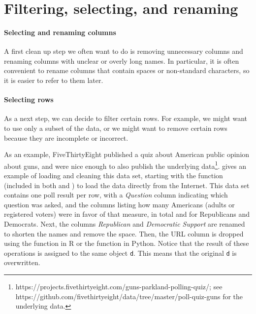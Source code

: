 \section{Filtering, selecting, and renaming}


\paragraph{Selecting and renaming columns}
A first clean up step we often want to do is removing unnecessary columns and renaming columns with unclear or overly long names.
In particular, it is often convenient to rename columns that contain spaces or non-standard characters, so it is easier to refer to them later.

\paragraph{Selecting rows}
As a next step, we can decide to filter certain rows.
For example, we might want to use only a subset of the data,
or we might want to remove certain rows because they are incomplete or incorrect.

As an example, FiveThirtyEight published a quiz about American public opinion about guns,
and were nice enough to also publish the underlying data\footnote{https://projects.fivethirtyeight.com/guns-parkland-polling-quiz/; see https://github.com/fivethirtyeight/data/tree/master/poll-quiz-guns for the underlying data.}.
 gives an example of loading and cleaning this data set, starting with the function  (included in both  and ) to load the data directly from the Internet.
This data set contains one poll result per row, with a \emph{Question} column indicating which question was asked,
and the columns listing how many Americans (adults or registered voters) were in favor of that measure, in total and for Republicans and Democrats.
Next, the columns \emph{Republican} and \emph{Democratic Support} are renamed to shorten the names and remove the space.
Then, the URL column is dropped using the  function  in R or the  function  in Python.
Notice that the result of these operations is assigned to the same object \texttt{d}.
This means that the original \texttt{d} is overwritten.

  
